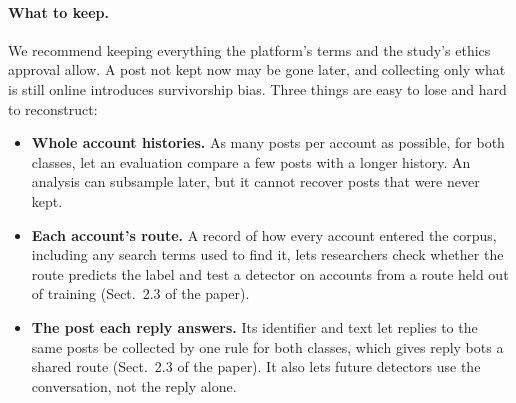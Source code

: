 \documentclass[10pt,a4paper]{article}
\begin{document}
\paragraph{What to keep.}
We recommend keeping everything the platform's terms and the study's ethics approval allow.
A post not kept now may be gone later, and collecting only what is still online introduces
  survivorship bias.
Three things are easy to lose and hard to reconstruct:
\begin{itemize}
\item \textbf{Whole account histories.} As many posts per account as possible, for both classes,
  let an evaluation compare a few posts with a longer history. An analysis can subsample later,
  but it cannot recover posts that were never kept.
\item \textbf{Each account's route.} A record of how every account entered the corpus, including
  any search terms used to find it, lets researchers check whether the route predicts the label
  and test a detector on accounts from a route held out of training (Sect.~2.3 of the paper).
\item \textbf{The post each reply answers.} Its identifier and text let replies to the same posts
  be collected by one rule for both classes, which gives reply bots a shared route
  (Sect.~2.3 of the paper). It also lets future detectors use the conversation, not the reply alone.
\end{itemize}


\end{document}
